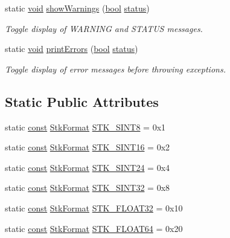 \begin{DoxyCompactItemize}
static \hyperlink{sound_8c_ae35f5844602719cf66324f4de2a658b3}{void} \hyperlink{class_nyq_1_1_stk_ae9d0da2ed11e2ec410993499250585e2}{show\+Warnings} (\hyperlink{mac_2config_2i386_2lib-src_2libsoxr_2soxr-config_8h_abb452686968e48b67397da5f97445f5b}{bool} \hyperlink{rfft2d_test_m_l_8m_a1b5437a866e6f95107b07ba845bc1800}{status})
\begin{DoxyCompactList}\small\item\em Toggle display of W\+A\+R\+N\+I\+NG and S\+T\+A\+T\+US messages. \end{DoxyCompactList}\item 
static \hyperlink{sound_8c_ae35f5844602719cf66324f4de2a658b3}{void} \hyperlink{class_nyq_1_1_stk_ae2c5d0906c856ce8e0a3c1e3b898bf7e}{print\+Errors} (\hyperlink{mac_2config_2i386_2lib-src_2libsoxr_2soxr-config_8h_abb452686968e48b67397da5f97445f5b}{bool} \hyperlink{rfft2d_test_m_l_8m_a1b5437a866e6f95107b07ba845bc1800}{status})
\begin{DoxyCompactList}\small\item\em Toggle display of error messages before throwing exceptions. \end{DoxyCompactList}\end{DoxyCompactItemize}
\subsection*{Static Public Attributes}
\begin{DoxyCompactItemize}
\item 
static \hyperlink{getopt1_8c_a2c212835823e3c54a8ab6d95c652660e}{const} \hyperlink{class_nyq_1_1_stk_aa6d484c1fa51ab651997a158cdc42526}{Stk\+Format} \hyperlink{class_nyq_1_1_stk_a5534403dfce86091451c6f23f48e39b3}{S\+T\+K\+\_\+\+S\+I\+N\+T8} = 0x1
\item 
static \hyperlink{getopt1_8c_a2c212835823e3c54a8ab6d95c652660e}{const} \hyperlink{class_nyq_1_1_stk_aa6d484c1fa51ab651997a158cdc42526}{Stk\+Format} \hyperlink{class_nyq_1_1_stk_a74923e12da75c2b13fac753ae381fbe3}{S\+T\+K\+\_\+\+S\+I\+N\+T16} = 0x2
\item 
static \hyperlink{getopt1_8c_a2c212835823e3c54a8ab6d95c652660e}{const} \hyperlink{class_nyq_1_1_stk_aa6d484c1fa51ab651997a158cdc42526}{Stk\+Format} \hyperlink{class_nyq_1_1_stk_a02d5a1c8e8d98868a158053727ef4315}{S\+T\+K\+\_\+\+S\+I\+N\+T24} = 0x4
\item 
static \hyperlink{getopt1_8c_a2c212835823e3c54a8ab6d95c652660e}{const} \hyperlink{class_nyq_1_1_stk_aa6d484c1fa51ab651997a158cdc42526}{Stk\+Format} \hyperlink{class_nyq_1_1_stk_acf8717472230415ff11bf499fc079bc5}{S\+T\+K\+\_\+\+S\+I\+N\+T32} = 0x8
\item 
static \hyperlink{getopt1_8c_a2c212835823e3c54a8ab6d95c652660e}{const} \hyperlink{class_nyq_1_1_stk_aa6d484c1fa51ab651997a158cdc42526}{Stk\+Format} \hyperlink{class_nyq_1_1_stk_a63c3942bca00afc51c38e6c2c99f72db}{S\+T\+K\+\_\+\+F\+L\+O\+A\+T32} = 0x10
\item 
static \hyperlink{getopt1_8c_a2c212835823e3c54a8ab6d95c652660e}{const} \hyperlink{class_nyq_1_1_stk_aa6d484c1fa51ab651997a158cdc42526}{Stk\+Format} \hyperlink{class_nyq_1_1_stk_a7c6c1932fcab4d5adacd9ae4c3d36054}{S\+T\+K\+\_\+\+F\+L\+O\+A\+T64} = 0x20
\end{DoxyCompactItemize}
